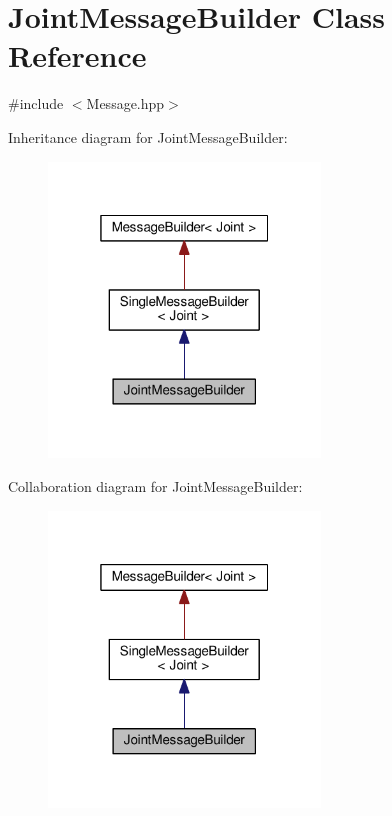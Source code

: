 \hypertarget{classJointMessageBuilder}{}\section{Joint\+Message\+Builder Class Reference}
\label{classJointMessageBuilder}


{\ttfamily \#include $<$Message.\+hpp$>$}



Inheritance diagram for Joint\+Message\+Builder\+:\nopagebreak
\begin{figure}[H]
\begin{center}
\leavevmode
\includegraphics[width=205pt]{classJointMessageBuilder__inherit__graph}
\end{center}
\end{figure}


Collaboration diagram for Joint\+Message\+Builder\+:
\nopagebreak
\begin{figure}[H]
\begin{center}
\leavevmode
\includegraphics[width=205pt]{classJointMessageBuilder__coll__graph}
\end{center}
\end{figure}
